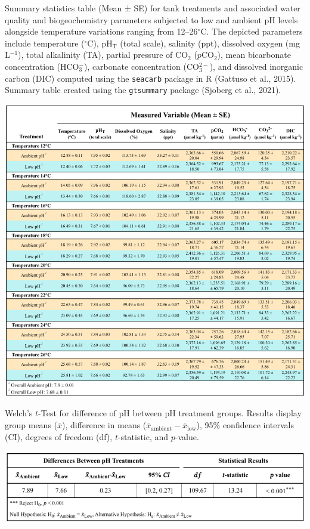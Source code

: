 \documentclass{CSUNthesis}
\begin{document}
\begin{table}[H]
\caption[Summary statistics for mesocosm tank treatments.]{Summary statistics table (Mean ± SE) for tank treatments and associated water quality and biogeochemistry parameters subjected to low and ambient pH levels alongside temperature variations ranging from 12–26$^\circ$C. The depicted parameters include temperature ($^\circ$C), pH$_\mathrm{T}$ (total scale), salinity (ppt), dissolved oxygen (mg L$^{-1}$), total alkalinity (TA), partial pressure of CO$_2$ ($p$CO$_2$), mean bicarbonate concentration (HCO$_3^-$), carbonate concentration (CO$_3^{2-}$), and dissolved inorganic carbon (DIC) computed using the \texttt{seacarb} package in R (Gattuso et al., 2015). Summary table created using the \texttt{gtsummary} package (Sjoberg et al., 2021).}
\centering
\includegraphics[width=5.5in]{figures/appendix/Appendix_2_Mesocosm_Table.png}
\label{tab:appendixB1}
\end{table}

\begin{table}[H]
\caption[Welch's $t$-test results for pH differences.]{Welch's $t$-Test for difference of pH between pH treatment groups. Results display group means ($\bar{x}$), difference in means ($\bar{x}_{\text{ambient}} - \bar{x}_{\text{low}}$), 95\% confidence intervals (CI), degrees of freedom (df), $t$-statistic, and $p$-value.}
\centering
\includegraphics[width=6in]{figures/appendix/Appendix_3_ttest_pH.png}
\label{tab:appendixB2}
\end{table}
\end{document}

